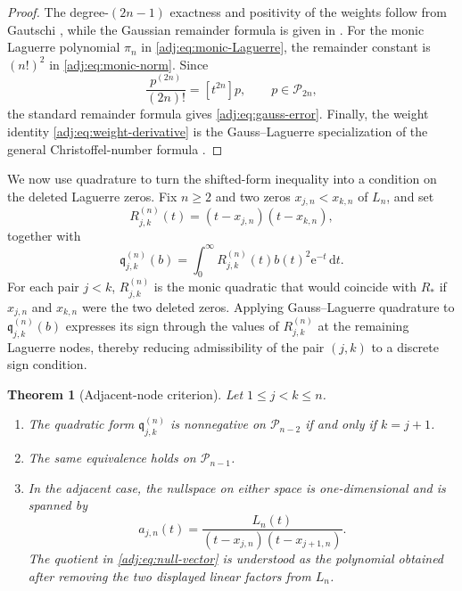 \documentclass[11pt]{article}
\numberwithin{equation}{section}
\newtheorem{theorem}{Theorem}[section]
\theoremstyle{definition}
\theoremstyle{remark}
\newcommand{\Pcal}{\mathcal P}
\newcommand{\Lag}{L}
\newcommand{\dd}{\,\mathrm d}
\newcommand{\e}{\mathrm e}
\begin{document}
\begin{proof}
The degree-$(2n-1)$ exactness and positivity of the weights follow from
Gautschi \cite[Theorems~1.45--1.46]{gautschi2004}, while the Gaussian
remainder formula is given in
\cite[Corollary to Theorem~1.48, Eq.~(1.4.14)]{gautschi2004}.
For the monic Laguerre polynomial
$\pi_n$ in \eqref{adj:eq:monic-Laguerre}, the remainder constant is $(n!)^2$ in \eqref{adj:eq:monic-norm}.
Since
\[
\frac{p^{(2n)}}{(2n)!}=[t^{2n}]p,
\qquad p\in\Pcal_{2n},
\]
the standard remainder formula gives \eqref{adj:eq:gauss-error}.
Finally, the weight identity \eqref{adj:eq:weight-derivative} is the
Gauss--Laguerre specialization of the general Christoffel-number formula
\cite[Theorem~1.47, Eq.~(1.4.9)]{gautschi2004}.
\end{proof}








We now use quadrature to turn the shifted-form inequality into a condition on the deleted Laguerre zeros. Fix $n\ge2$ and two zeros $x_{j,n}<x_{k,n}$ of $\Lag_n$, and set
$$
R_{j,k}^{(n)}(t)=
(t-x_{j,n})(t-x_{k,n}),
$$
together with
$$
\mathfrak q_{j,k}^{(n)}(b)
=
\int_0^\infty
R_{j,k}^{(n)}(t)b(t)^2\e^{-t}\dd t.
$$
For each pair $j<k$, $R_{j,k}^{(n)}$ is the monic quadratic that would coincide with $R_*$ if $x_{j,n}$ and $x_{k,n}$ were the two deleted zeros.
Applying Gauss--Laguerre quadrature to $\mathfrak q_{j,k}^{(n)}(b)$ expresses its sign through the values of $R_{j,k}^{(n)}$ at the remaining Laguerre nodes, thereby reducing admissibility of the pair $(j,k)$ to a discrete sign condition.


\begin{theorem}[Adjacent-node criterion]\label{adj:thm:adjacent}
Let $1\leq j<k\leq n$.
\begin{enumerate}[label=\textup{(\roman*)}]
\item The quadratic form $\mathfrak q_{j,k}^{(n)}$ is nonnegative on $\Pcal_{n-2}$ if and only if $k=j+1$.
\item The same equivalence holds on $\Pcal_{n-1}$.
\item In the adjacent case, the nullspace on either space is one-dimensional and is spanned by
\begin{equation}\label{adj:eq:null-vector}
 a_{j,n}(t)
 =\frac{\Lag_n(t)}
 {(t-x_{j,n})(t-x_{j+1,n})}.
\end{equation}
The quotient in \eqref{adj:eq:null-vector} is understood as the
polynomial obtained after removing the two displayed linear factors from
$\Lag_n$.
\end{enumerate}
\end{theorem}
\end{document}
